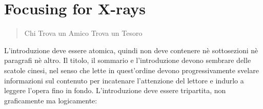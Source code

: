 \chapter{Focusing for X-rays}
\label{Introduzione}
\thispagestyle{empty}

\begin{quotation}
{\footnotesize
{}
\begin{flushright}
Chi Trova un Amico Trova un Tesoro
\end{flushright}
}
\end{quotation}
\vspace{0.5cm}

\noindent L'introduzione deve essere atomica, quindi non deve contenere n\`e sottosezioni n\`e paragrafi n\`e altro. Il titolo, il sommario e l'introduzione devono sembrare delle scatole cinesi, nel senso che lette in quest'ordine devono progressivamente svelare informazioni sul contenuto per incatenare l'attenzione del lettore e indurlo a leggere l'opera fino in fondo. L'introduzione deve essere tripartita, non graficamente ma logicamente:

